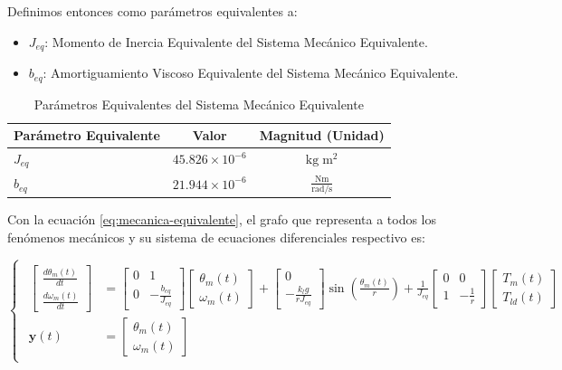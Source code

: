 \documentclass[blue,fullpaper]{ludusofficial}  %
\begin{document}
Definimos entonces como parámetros equivalentes a:

\begin{itemize}
    \item$J_{eq}$: Momento de Inercia Equivalente del Sistema Mecánico Equivalente.
    \item$b_{eq}$: Amortiguamiento Viscoso Equivalente del Sistema Mecánico Equivalente.
\end{itemize}

\begin{table}[htbp]
    \centering
    \caption{Parámetros Equivalentes del Sistema Mecánico Equivalente}
    \small
    \begin{tabular}{lcc}
        \hline
        \textbf{Parámetro Equivalente} & \textbf{Valor} & \textbf{Magnitud (Unidad)} \\
        \hline
        $J_{eq}$ & $45.826 \times 10^{-6}$ & $\mathrm{\mathrm{kg \; m^2}}$ \\
        $b_{eq}$ & $21.944 \times 10^{-6}$ & $\mathrm{\mathrm{\frac{Nm}{rad/s}}}$ \\
        \hline
    \end{tabular}
\end{table}

Con la ecuación \eqref{eq:mecanica-equivalente}, el grafo que representa a todos los fenómenos mecánicos y su sistema de ecuaciones diferenciales respectivo es:

\begin{equation}
\label{eq:modelo-mecanico}
    \begin{cases} %
    \begin{aligned}
        \begin{bmatrix} \frac{d\theta_{m}(t)}{dt} \\ \frac{d\omega_{m}(t)}{dt} \end{bmatrix} &= 
        \begin{bmatrix} 0 & 1 \\ 0 & -\frac{b_{eq}}{J_{eq}} \end{bmatrix} 
        \begin{bmatrix} \theta_{m}(t) \\ \omega_{m}(t) \end{bmatrix} + 
        \begin{bmatrix} 0 \\ -\frac{k_{l}g}{r J_{eq}} \end{bmatrix} \sin \left( \frac{\theta_{m}(t)}{r} \right) + 
        \frac{1}{J_{eq}} \begin{bmatrix} 0 & 0 \\ 1 & -\frac{1}{r} \end{bmatrix} 
        \begin{bmatrix} T_{m}(t) \\ T_{ld}(t) \end{bmatrix} \\[10pt]
        \mathbf{y}(t) &= \begin{bmatrix} \theta_{m}(t) \\ \omega_{m}(t) \end{bmatrix}
    \end{aligned}
    \end{cases}
\end{equation}
\end{document}
